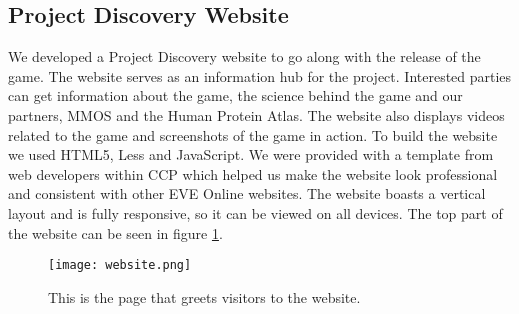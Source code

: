 \subsection{Project Discovery Website}
We developed a Project Discovery website to go along with the release of the game. The website serves as an information hub for the project. Interested parties can get information about the game, the science behind the game and our partners, MMOS and the Human Protein Atlas. The website also displays videos related to the game and screenshots of the game in action. To build the website we used HTML5, Less and JavaScript. We were provided with a template from web developers within CCP which helped us make the website look professional and consistent with other EVE Online websites. The website boasts a vertical layout and is fully responsive, so it can be viewed on all devices. The top part of the website can be seen in figure \ref{fig:website}.

\begin{figure}[H]
\centering
\graphicspath{ {./graphics/} }
\centerline{\texttt{[image: website.png]}}
\caption{\label{fig:website} This is the page that greets visitors to the website.}
\end{figure}
